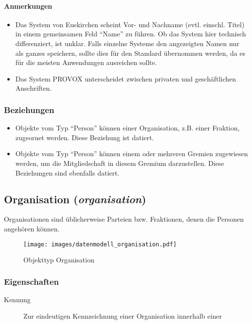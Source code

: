 \documentclass[,a4paper]{article}
\makeatletter
\def\maxwidth{\ifdim\Gin@nat@width>\linewidth\linewidth
\else\Gin@nat@width\fi}
\let\Oldincludegraphics\includegraphics
\renewcommand{\includegraphics}[1]{\Oldincludegraphics[width=\maxwidth]{#1}}
\makeatother
\begin{document}
\paragraph{Anmerkungen}

\begin{itemize}
\item
  Das System von Euskirchen scheint Vor- und Nachname (evtl. einschl.
  Titel) in einem gemeinsamen Feld ``Name'' zu führen. Ob das System
  hier technisch differenziert, ist unklar. Falls einzelne Systeme den
  angezeigten Namen nur als ganzes speichern, sollte dies für den
  Standard übernommen werden, da es für die meisten Anwendungen
  ausreichen sollte.
\item
  Das System PROVOX unterscheidet zwischen privaten und geschäftlichen
  Anschriften.
\end{itemize}

\subsubsection{Beziehungen}

\begin{itemize}
\item
  Objekte vom Typ ``Person'' können einer Organisation, z.B. einer
  Fraktion, zugeornet werden. Diese Beziehung ist datiert.
\item
  Objekte vom Typ ``Person'' können einem oder mehreren Gremien
  zugewiesen werden, um die Mitgliedschaft in diesem Gremium
  darzustellen. Diese Beziehungen sind ebenfalls datiert.
\end{itemize}

\subsection{Organisation (\emph{organisation})}

Organisationen sind üblicherweise Parteien bzw. Fraktionen, denen die
Personen angehören können.

\begin{figure}[htbp]
\centering
\texttt{[image: images/datenmodell\_organisation.pdf]}
\caption{Objekttyp Organisation}
\end{figure}

\subsubsection{Eigenschaften}

\begin{description}
\item[Kennung]
Zur eindeutigen Kennzeichnung einer Organisation innerhalb einer
\end{description}
\end{document}
